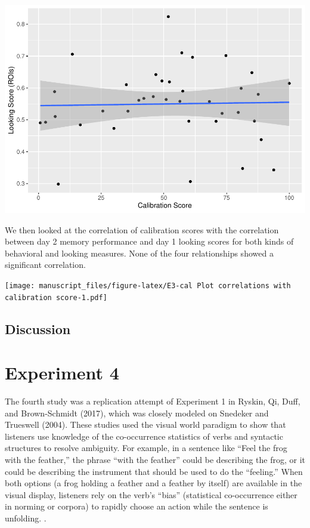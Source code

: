 \documentclass[
  man,floatsintext]{apa6}
\begin{document}
\includegraphics{manuscript_files/figure-latex/E3-cal Plot looking score (roi) by calibration-1.pdf}

We then looked at the correlation of calibration scores with the correlation between day 2 memory performance and day 1 looking scores for both kinds of behavioral and looking measures. None of the four relationships showed a significant correlation.

\texttt{[image: manuscript\_files/figure-latex/E3-cal Plot correlations with calibration score-1.pdf]}

\hypertarget{discussion-2}{%
\subsection{Discussion}\label{discussion-2}}

\hypertarget{experiment-4}{%
\section{Experiment 4}\label{experiment-4}}

The fourth study was a replication attempt of Experiment 1 in
Ryskin, Qi, Duff, and Brown-Schmidt (2017), which was closely modeled on
Snedeker and Trueswell (2004). These studies used the
visual world paradigm to show that listeners use knowledge of the
co-occurrence statistics of verbs and syntactic structures to resolve
ambiguity. For example, in a sentence like ``Feel the frog with the
feather,'' the phrase ``with the feather'' could be describing the frog, or
it could be describing the instrument that should be used to do the
``feeling.'' When both options (a frog holding a feather and a feather by
itself) are available in the visual display, listeners rely on the
verb's ``bias'' (statistical co-occurrence either in norming or corpora)
to rapidly choose an action while the sentence is unfolding. .
\end{document}
